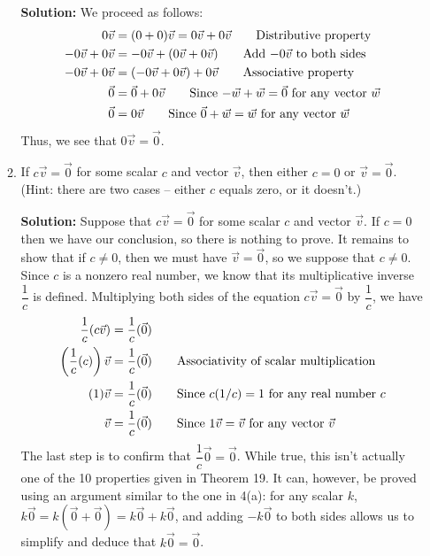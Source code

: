 \documentclass[12pt]{article}
\begin{document}
\begin{enumerate}
\begin{enumerate}
\bigskip

{\bf Solution:} We proceed as follows:
\begin{align*}
 0\vec{v} & = (0+0)\vec{v} = 0\vec{v}+0\vec{v} \tag*{Distributive property}\\
 -0\vec{v} +0\vec{v} & = -0\vec{v}+(0\vec{v}+0\vec{v}) \tag*{Add $-0\vec{v}$ to both sides}\\
 -0\vec{v}+0\vec{v} & = (-0\vec{v}+0\vec{v})+0\vec{v} \tag*{Associative property}\\
 \vec{0} & = \vec{0} + 0\vec{v} \tag*{Since $-\vec{w}+\vec{w}=\vec{0}$ for any vector $\vec{w}$}\\
 \vec{0} & = 0\vec{v} \tag*{Since $\vec{0}+\vec{w}=\vec{w}$ for any vector $\vec{w}$}
\end{align*}
Thus, we see that $0\vec{v} = \vec{0}$.

\medskip


 \item If $c\vec{v}=\vec{0}$ for some scalar $c$ and vector $\vec{v}$, then either $c=0$ or $\vec{v}=\vec{0}$.\\
(Hint: there are two cases -- either $c$ equals zero, or it doesn't.)

\bigskip

{\bf Solution:} Suppose that $c\vec{v}=\vec{0}$ for some scalar $c$ and vector $\vec{v}$. If $c=0$ then we have our conclusion, so there is nothing to prove. It remains to show that if $c\neq 0$, then we must have $\vec{v}=\vec{0}$, so we suppose that $c\neq 0$. Since $c$ is a nonzero real number, we know that its multiplicative inverse $\dfrac{1}{c}$ is defined. Multiplying both sides of the equation $c\vec{v}=\vec{0}$ by $\dfrac{1}{c}$, we have
\begin{align*}
 \frac{1}{c}(c\vec{v}) &= \frac{1}{c}(\vec{0})\\
 \left(\frac{1}{c}(c)\right)\vec{v} & = \frac{1}{c}(\vec{0}) \tag*{Associativity of scalar multiplication}\\
 (1)\vec{v} & = \frac{1}{c}(\vec{0}) \tag*{Since $c(1/c)=1$ for any real number $c$}\\
 \vec{v} & = \frac{1}{c}(\vec{0}) \tag*{Since $1\vec{v}=\vec{v}$ for any vector $\vec{v}$}
\end{align*}
The last step is to confirm that $\dfrac{1}{c}\vec{0} = \vec{0}$. While true, this isn't actually one of the 10 properties given in Theorem 19. It can, however, be proved using an argument similar to the one in 4(a): for any scalar $k$, $k\vec{0} = k(\vec{0}+\vec{0}) = k\vec{0}+k\vec{0}$, and adding $-k\vec{0}$ to both sides allows us to simplify and deduce that $k\vec{0}=\vec{0}$.
\end{enumerate}

 \end{enumerate}
\end{document}
